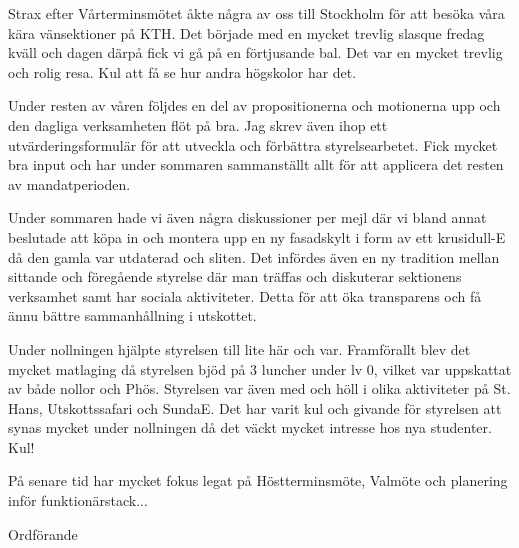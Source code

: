 \documentclass[../_main/handlingar.tex]{subfiles}
\begin{document}

Strax efter Vårterminsmötet åkte några av oss till Stockholm för att besöka våra kära vänsektioner på KTH. Det började med en mycket trevlig slasque fredag kväll och dagen därpå fick vi gå på en förtjusande bal. Det var en mycket trevlig och rolig resa. Kul att få se hur andra högskolor har det.

Under resten av våren följdes en del av propositionerna och motionerna upp och den dagliga verksamheten flöt på bra. Jag skrev även ihop ett utvärderingsformulär för att utveckla och förbättra styrelsearbetet. Fick mycket bra input och har under sommaren sammanställt allt för att applicera det resten av mandatperioden.

Under sommaren hade vi även några diskussioner per mejl där vi bland annat beslutade att köpa in och montera upp en ny fasadskylt i form av ett krusidull-E då den gamla var utdaterad och sliten. Det infördes även en ny tradition mellan sittande och föregående styrelse där man träffas och diskuterar sektionens verksamhet samt har sociala aktiviteter. Detta för att öka transparens och få ännu bättre sammanhållning i utskottet.

Under nollningen hjälpte styrelsen till lite här och var. Framförallt blev det mycket matlaging då styrelsen bjöd på 3 luncher under lv 0, vilket var uppskattat av både nollor och Phös. Styrelsen var även med och höll i olika aktiviteter på St. Hans, Utskottssafari och SundaE. Det har varit kul och givande för styrelsen att synas mycket under nollningen då det väckt mycket intresse hos nya studenter. Kul!

På senare tid har mycket fokus legat på Höstterminsmöte, Valmöte och planering inför funktionärstack...


\begin{signatures}{1}
    \mvh
    \signature{\ordf}{Ordförande}
\end{signatures}
\end{document}
